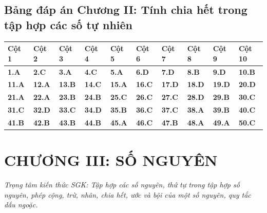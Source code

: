 \documentclass[11pt,a4paper]{article}
\begin{document}
\subsection*{\color{primary} Bảng đáp án Chương II: Tính chia hết trong tập hợp các số tự nhiên}
\begin{center}
\renewcommand{\arraystretch}{1.25}
\begin{tabularx}{\textwidth}{*{10}{>{\centering\arraybackslash}X}}
\toprule
\textbf{\color{primary} Cột 1} & \textbf{\color{primary} Cột 2} & \textbf{\color{primary} Cột 3} & \textbf{\color{primary} Cột 4} & \textbf{\color{primary} Cột 5} & \textbf{\color{primary} Cột 6} & \textbf{\color{primary} Cột 7} & \textbf{\color{primary} Cột 8} & \textbf{\color{primary} Cột 9} & \textbf{\color{primary} Cột 10} \\
\midrule
\textbf{1.A} & \textbf{2.C} & \textbf{3.A} & \textbf{4.C} & \textbf{5.A} & \textbf{6.D} & \textbf{7.D} & \textbf{8.B} & \textbf{9.D} & \textbf{10.B} \\
\rowcolor{rowtint} \textbf{11.A} & \textbf{12.A} & \textbf{13.B} & \textbf{14.C} & \textbf{15.A} & \textbf{16.C} & \textbf{17.D} & \textbf{18.D} & \textbf{19.D} & \textbf{20.D} \\
\textbf{21.A} & \textbf{22.A} & \textbf{23.B} & \textbf{24.B} & \textbf{25.C} & \textbf{26.C} & \textbf{27.C} & \textbf{28.D} & \textbf{29.B} & \textbf{30.C} \\
\rowcolor{rowtint} \textbf{31.C} & \textbf{32.D} & \textbf{33.C} & \textbf{34.D} & \textbf{35.B} & \textbf{36.C} & \textbf{37.C} & \textbf{38.A} & \textbf{39.B} & \textbf{40.C} \\
\textbf{41.B} & \textbf{42.B} & \textbf{43.B} & \textbf{44.B} & \textbf{45.A} & \textbf{46.C} & \textbf{47.B} & \textbf{48.A} & \textbf{49.A} & \textbf{50.C} \\
\bottomrule
\end{tabularx}
\end{center}\vspace{10pt}
\section*{\color{primary} CHƯƠNG III: SỐ NGUYÊN}
\textit{Trọng tâm kiến thức SGK: Tập hợp các số nguyên, thứ tự trong tập hợp số nguyên, phép cộng, trừ, nhân, chia hết, ước và bội của một số nguyên, quy tắc dấu ngoặc.}\par\vspace{4pt}
\end{document}
